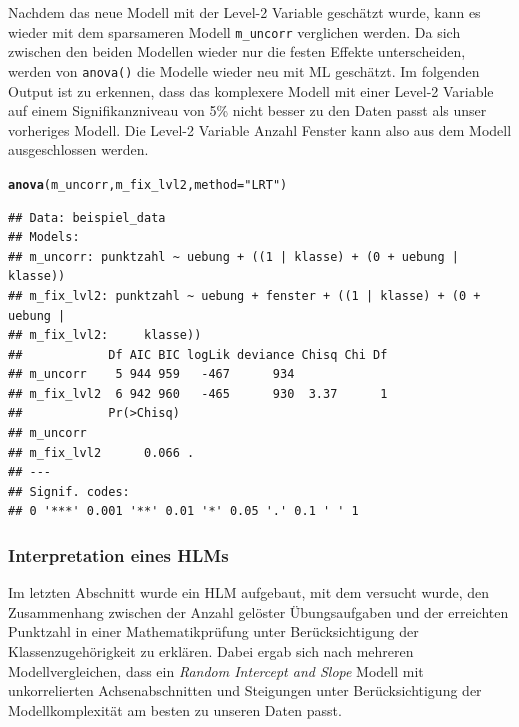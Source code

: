 \documentclass[12pt]{article}\usepackage[]{graphicx}\usepackage[]{color}
\makeatletter
\newcommand{\hlstr}[1]{\textcolor[rgb]{0.192,0.494,0.8}{#1}}%
\newcommand{\hlstd}[1]{\textcolor[rgb]{0.345,0.345,0.345}{#1}}%
\newcommand{\hlkwc}[1]{\textcolor[rgb]{0.333,0.667,0.333}{#1}}%
\newcommand{\hlkwd}[1]{\textcolor[rgb]{0.737,0.353,0.396}{\textbf{#1}}}%
\newenvironment{kframe}{%
 \def\at@end@of@kframe{}%
 \ifinner\ifhmode%
  \def\at@end@of@kframe{\end{minipage}}%
  \begin{minipage}{\columnwidth}%
 \fi\fi%
 \def\FrameCommand##1{\hskip\@totalleftmargin \hskip-\fboxsep
 \colorbox{shadecolor}{##1}\hskip-\fboxsep
     \hskip-\linewidth \hskip-\@totalleftmargin \hskip\columnwidth}%
 \MakeFramed {\advance\hsize-\width
   \@totalleftmargin\z@ \linewidth\hsize
   \@setminipage}}%
 {\par\unskip\endMakeFramed%
 \at@end@of@kframe}
\newenvironment{knitrout}{}{} %
\makeatother
\begin{document}
Nachdem das neue Modell mit der Level-2 Variable geschätzt wurde, kann es wieder mit dem sparsameren Modell \texttt{m\_uncorr} verglichen werden. Da sich zwischen den beiden Modellen wieder nur die festen Effekte unterscheiden, werden von \texttt{anova()} die Modelle wieder neu mit ML geschätzt. Im folgenden Output ist zu erkennen, dass das komplexere Modell mit einer Level-2 Variable auf einem Signifikanzniveau von 5\% nicht besser zu den Daten passt als unser vorheriges Modell. Die Level-2 Variable Anzahl Fenster kann also aus dem Modell ausgeschlossen werden.

\singlespacing
\begin{knitrout}
\color{fgcolor}\begin{kframe}
\begin{alltt}
\hlkwd{anova}\hlstd{(m_uncorr, m_fix_lvl2,} \hlkwc{method} \hlstd{=} \hlstr{"LRT"}\hlstd{)}
\end{alltt}


{\ttfamily\noindent\itshape\color{messagecolor}{\#\# refitting model(s) with ML (instead of REML)}}\begin{verbatim}
## Data: beispiel_data
## Models:
## m_uncorr: punktzahl ~ uebung + ((1 | klasse) + (0 + uebung | klasse))
## m_fix_lvl2: punktzahl ~ uebung + fenster + ((1 | klasse) + (0 + uebung | 
## m_fix_lvl2:     klasse))
##            Df AIC BIC logLik deviance Chisq Chi Df
## m_uncorr    5 944 959   -467      934             
## m_fix_lvl2  6 942 960   -465      930  3.37      1
##            Pr(>Chisq)  
## m_uncorr               
## m_fix_lvl2      0.066 .
## ---
## Signif. codes:  
## 0 '***' 0.001 '**' 0.01 '*' 0.05 '.' 0.1 ' ' 1
\end{verbatim}
\end{kframe}
\end{knitrout}

\subsubsection{Interpretation eines HLMs}
Im letzten Abschnitt wurde ein HLM aufgebaut, mit dem versucht wurde, den Zusammenhang zwischen der Anzahl gelöster Übungsaufgaben und der erreichten Punktzahl in einer Mathematikprüfung unter Berücksichtigung der Klassenzugehörigkeit zu erklären. Dabei ergab sich nach mehreren Modellvergleichen, dass ein \textit{Random Intercept and Slope} Modell mit unkorrelierten Achsenabschnitten und Steigungen unter Berücksichtigung der Modellkomplexität am besten zu unseren Daten passt.
\end{document}
